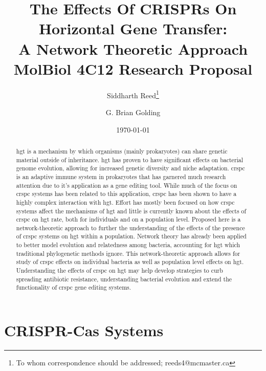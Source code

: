 \documentclass[12pt,letter]{article}
\begin{document}
\title{The Effects Of CRISPRs On Horizontal Gene Transfer:\\
        A Network Theoretic Approach\\ \vspace{0.5cm}
       \Large MolBiol 4C12 Research Proposal}
\author[1]{Siddharth Reed\thanks{To whom correspondence should be addressed; reeds4@mcmaster.ca}}
\author[1]{G. Brian Golding}
\date{\today}
\maketitle
\begin{abstract}
    \ac{hgt} is a mechanism by which organisms (mainly prokaryotes) can share genetic material outside of inheritance.
    \ac{hgt} has proven to have significant effects on bacterial genome evolution, allowing for increased genetic diversity and niche adaptation.
    \ac{crspc} is an adaptive immune system in prokaryotes that has garnered much research attention due to it's application as a gene editing tool.
    While much of the focus on \ac{crspc} systems has been related to this application, \ac{crspc} has been shown to have a highly complex interaction with \ac{hgt}.
    Effort has mostly been focused on how \ac{crspc} systems affect the mechanisms of \ac{hgt} and little is currently known about the effects of \ac{crspc} on \ac{hgt} rate, both for individuals and on a population level.
    Proposed here is a network-theoretic approach to further the understanding of the effects of the presence of \ac{crspc} systems on \ac{hgt} within a population.
    Network theory has already been applied to better model evolution and relatedness among bacteria, accounting for \ac{hgt} which traditional phylogenetic methods ignore.
    This network-theoretic approach allows for study of \ac{crspc} effects on individual bacteria as well as population level effects on \ac{hgt}.
    Understanding the effects of \ac{crspc} on \ac{hgt} may help develop strategies to curb spreading antibiotic resistance, understanding bacterial evolution and extend the functionality of \ac{crspc} gene editing systems.
\end{abstract}
\newpage
\linespread{1.25}%
\section{CRISPR-Cas Systems}
\end{document}
